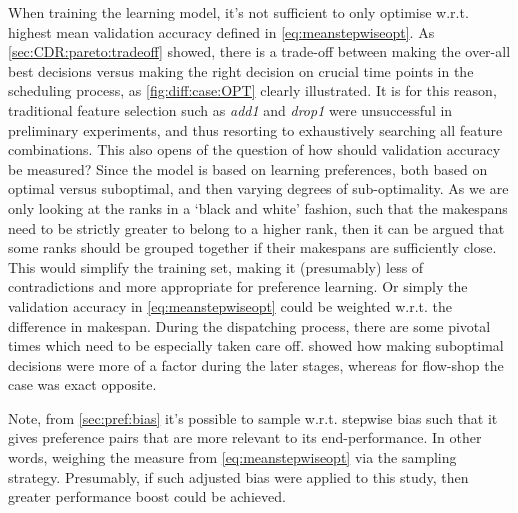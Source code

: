 When training the learning model, it's not sufficient to only optimise w.r.t. 
highest mean validation accuracy defined in \cref{eq:meanstepwiseopt}. 
As \cref{sec:CDR:pareto:tradeoff} showed, there is a trade-off between making 
the over-all best decisions versus making the right decision on crucial time 
points in the scheduling process, as \cref{fig:diff:case:OPT} clearly 
illustrated. 
It is for this reason, traditional feature selection such as \emph{add1} and 
\emph{drop1} were unsuccessful in preliminary experiments, 
and thus resorting to exhaustively searching all feature combinations.
This also opens of the question of how should validation accuracy be measured? 
Since the model is based on learning preferences, both based on optimal versus 
suboptimal, and then varying degrees of sub-optimality. As we are only looking 
at the ranks in a `black and white' fashion, such that the makespans need to be 
strictly greater to belong to a higher rank, then it can be argued that some 
ranks should be grouped together if their makespans are sufficiently close. 
This would simplify the training set, making it (presumably) less of 
contradictions and more appropriate for preference learning. Or simply the 
validation accuracy in \cref{eq:meanstepwiseopt} could be weighted w.r.t. the  
difference in makespan.
During the dispatching process, there are some pivotal times which need to be 
especially taken care off.  showed how making 
suboptimal decisions were more of a factor during the later stages, whereas for 
flow-shop the case was exact opposite. 

Note, from \cref{sec:pref:bias} it's possible to sample w.r.t. stepwise bias 
such that it gives preference pairs that are more relevant to its 
end-performance. In other words, weighing the measure from 
\cref{eq:meanstepwiseopt} via the sampling strategy. 
Presumably, if such adjusted bias were applied to this study, then greater 
performance boost could be achieved.